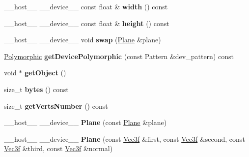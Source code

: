 \begin{DoxyCompactItemize}
\item 
\+\_\+\+\_\+host\+\_\+\+\_\+ \+\_\+\+\_\+device\+\_\+\+\_\+ const float \& {\bfseries width} () const\hypertarget{class_plane_a1c91bd58a15624b97a10912ed8169406}{}\label{class_plane_a1c91bd58a15624b97a10912ed8169406}

\item 
\+\_\+\+\_\+host\+\_\+\+\_\+ \+\_\+\+\_\+device\+\_\+\+\_\+ const float \& {\bfseries height} () const\hypertarget{class_plane_af8ebbcfced6954ead0f5efc91c532b95}{}\label{class_plane_af8ebbcfced6954ead0f5efc91c532b95}

\item 
\+\_\+\+\_\+host\+\_\+\+\_\+ \+\_\+\+\_\+device\+\_\+\+\_\+ void {\bfseries swap} (\hyperlink{class_plane}{Plane} \&plane)\hypertarget{class_plane_abd61cd7527ed084a867050bee3f4c4ec}{}\label{class_plane_abd61cd7527ed084a867050bee3f4c4ec}

\item 
\hyperlink{struct_polymorphic}{Polymorphic} {\bfseries get\+Device\+Polymorphic} (const Pattern \&dev\+\_\+pattern) const\hypertarget{class_plane_a67ce79f9411d96c278f0a3e7c2438f11}{}\label{class_plane_a67ce79f9411d96c278f0a3e7c2438f11}

\item 
void $\ast$ {\bfseries get\+Object} ()\hypertarget{class_plane_ac638c29a88ee505c9b84bcf79ba67509}{}\label{class_plane_ac638c29a88ee505c9b84bcf79ba67509}

\item 
size\+\_\+t {\bfseries bytes} () const\hypertarget{class_plane_a8a95c1d089d188c4c927bc67e5139775}{}\label{class_plane_a8a95c1d089d188c4c927bc67e5139775}

\item 
size\+\_\+t {\bfseries get\+Verts\+Number} () const\hypertarget{class_plane_aecf40d0480c922b6513be086f1a732a7}{}\label{class_plane_aecf40d0480c922b6513be086f1a732a7}

\item 
\+\_\+\+\_\+host\+\_\+\+\_\+ \+\_\+\+\_\+device\+\_\+\+\_\+ {\bfseries Plane} (const \hyperlink{class_plane}{Plane} \&plane)\hypertarget{class_plane_ad73917c92a73e36dcb1d716f79fdda04}{}\label{class_plane_ad73917c92a73e36dcb1d716f79fdda04}

\item 
\+\_\+\+\_\+host\+\_\+\+\_\+ \+\_\+\+\_\+device\+\_\+\+\_\+ {\bfseries Plane} (const \hyperlink{class_vec3}{Vec3f} \&first, const \hyperlink{class_vec3}{Vec3f} \&second, const \hyperlink{class_vec3}{Vec3f} \&third, const \hyperlink{class_vec3}{Vec3f} \&normal)\hypertarget{class_plane_adb0690a701aec7e890ffe616e05aa7b5}{}\label{class_plane_adb0690a701aec7e890ffe616e05aa7b5}


\end{DoxyCompactItemize}
